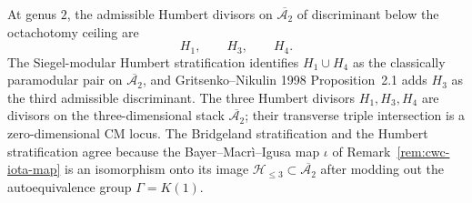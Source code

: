 \begin{remark}
\label{rem:cwc-ap5-propagation}
At genus $2$, the admissible Humbert divisors on
$\overline{\mathcal A_2}$ of discriminant below the octachotomy
ceiling are
\[
 H_1,\qquad H_3,\qquad H_4.
\]
The Siegel-modular Humbert stratification identifies
$H_1\cup H_4$ as the classically paramodular pair on
$\overline{\mathcal A_2}$, and
Gritsenko--Nikulin 1998 Proposition~2.1 adds $H_3$ as the third
admissible discriminant. The three Humbert divisors
$H_1,H_3,H_4$ are divisors on the three-dimensional stack
$\overline{\mathcal A_2}$; their transverse triple intersection is a
zero-dimensional CM locus. The Bridgeland
stratification and the Humbert stratification agree because the
Bayer--Macr\`i--Igusa map $\iota$ of
Remark~\ref{rem:cwc-iota-map} is an isomorphism onto its image
$\mathcal{H}_{\le 3}\subset\overline{\mathcal{A}_2}$ after
modding out the autoequivalence group $\Gamma=K(1)$.
\end{remark}

